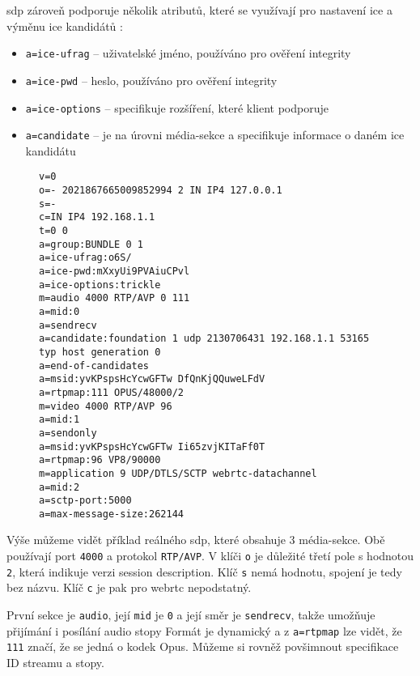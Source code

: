 \gls{sdp} zároveň podporuje několik atributů, které se využívají pro nastavení
\gls{ice} a výměnu \gls{ice} kandidátů
\parencite{WebRTCForTheCurious,IETF-RFC8839}:
\begin{itemize}
    \item \texttt{a=ice-ufrag} -- uživatelské jméno, používáno pro
          ověření integrity
    \item \texttt{a=ice-pwd} -- heslo, používáno pro ověření integrity
    \item \texttt{a=ice-options} -- specifikuje rozšíření, které
          klient podporuje
    \item \texttt{a=candidate} -- je na úrovni média-sekce a
          specifikuje informace o daném \gls{ice} kandidátu
\end{itemize}

\begin{figure}[H]
    \begin{verbatim}
v=0
o=- 2021867665009852994 2 IN IP4 127.0.0.1
s=-
c=IN IP4 192.168.1.1
t=0 0
a=group:BUNDLE 0 1
a=ice-ufrag:o6S/
a=ice-pwd:mXxyUi9PVAiuCPvl
a=ice-options:trickle
m=audio 4000 RTP/AVP 0 111
a=mid:0
a=sendrecv
a=candidate:foundation 1 udp 2130706431 192.168.1.1 53165 typ host generation 0
a=end-of-candidates
a=msid:yvKPspsHcYcwGFTw DfQnKjQQuweLFdV
a=rtpmap:111 OPUS/48000/2
m=video 4000 RTP/AVP 96
a=mid:1
a=sendonly
a=msid:yvKPspsHcYcwGFTw Ii65zvjKITaFf0T
a=rtpmap:96 VP8/90000
m=application 9 UDP/DTLS/SCTP webrtc-datachannel
a=mid:2
a=sctp-port:5000
a=max-message-size:262144
    \end{verbatim}
\end{figure}

Výše můžeme vidět příklad reálného \gls{sdp}, které obsahuje 3 média-sekce. Obě
používají port \texttt{4000} a protokol \texttt{RTP/AVP}. V
klíči \texttt{o} je důležité třetí pole s hodnotou
\texttt{2}, která indikuje verzi session description. Klíč
\texttt{s} nemá hodnotu, spojení je tedy bez názvu. Klíč
\texttt{c} je pak pro \gls{webrtc} nepodstatný.

První sekce je \texttt{audio}, její \texttt{mid} je
\texttt{0} a její směr je \texttt{sendrecv}, takže umožňuje
přijímání i posílání audio stopy Formát je dynamický a z
\texttt{a=rtpmap} lze vidět, že \texttt{111} značí, že se
jedná o kodek Opus. Můžeme si rovněž povšimnout specifikace ID streamu a stopy.

